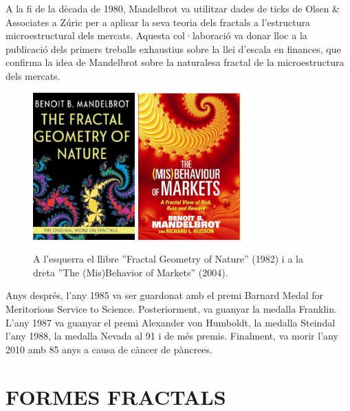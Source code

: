 \documentclass[12pt,a4paper]{report}
\begin{document}
A la fi de la dècada de 1980, Mandelbrot va utilitzar dades de ticks de Olsen \& Associates a Zúric per a aplicar la seva teoria dels fractals a l'estructura microestructural dels mercats. Aquesta col·laboració va donar lloc a la publicació dels primers treballs exhaustius sobre la llei d'escala en finances, que confirma la idea de Mandelbrot sobre la naturalesa fractal de la microestructura dels mercats.
\begin{figure}[!ht]
\centering
\includegraphics[width=0.35\textwidth]{img/img01_05_nature}
\includegraphics[width=0.35\textwidth]{img/img01_05_markets}
\caption{A l’esquerra el llibre ''Fractal Geometry of Nature'' (1982) i a la dreta ''The (Mis)Behavior of Markets'' (2004).}
\end{figure}
Anys després, l'any 1985 va ser guardonat amb el premi Barnard Medal for Meritorious Service to Science. Posteriorment, va guanyar la medalla Franklin. L’any 1987 va guanyar el premi Alexander von Humboldt, la medalla Steindal l'any 1988, la medalla Nevada al 91 i de més premis. Finalment, va morir l’any 2010 amb 85 anys a causa de càncer de pàncrees.

\chapter{FORMES FRACTALS}
\end{document}
